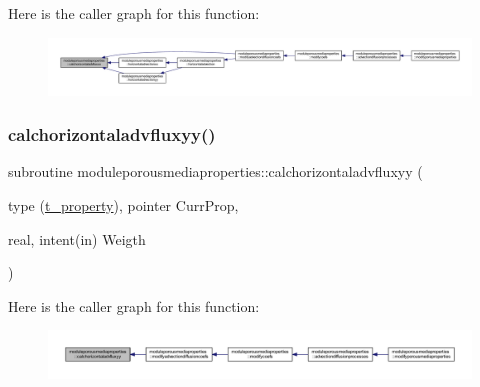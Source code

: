Here is the caller graph for this function\+:\nopagebreak
\begin{figure}[H]
\begin{center}
\leavevmode
\includegraphics[width=350pt]{namespacemoduleporousmediaproperties_a5723fa1fcf71ee69d8401d06efd65372_icgraph}
\end{center}
\end{figure}
\mbox{\label{namespacemoduleporousmediaproperties_a0a76735f032f1dc67ea140ec4b090be9}} 
\subsubsection{\texorpdfstring{calchorizontaladvfluxyy()}{calchorizontaladvfluxyy()}}
{\footnotesize\ttfamily subroutine moduleporousmediaproperties\+::calchorizontaladvfluxyy (\begin{DoxyParamCaption}\item[{type (\mbox{\hyperlink{structmoduleporousmediaproperties_1_1t__property}{t\+\_\+property}}), pointer}]{Curr\+Prop,  }\item[{real, intent(in)}]{Weigth }\end{DoxyParamCaption})\hspace{0.3cm}{\ttfamily [private]}}

Here is the caller graph for this function\+:\nopagebreak
\begin{figure}[H]
\begin{center}
\leavevmode
\includegraphics[width=350pt]{namespacemoduleporousmediaproperties_a0a76735f032f1dc67ea140ec4b090be9_icgraph}
\end{center}
\end{figure}
\mbox{\label{namespacemoduleporousmediaproperties_ac3477d319b62465ddf85f06d31d2310b}} 
